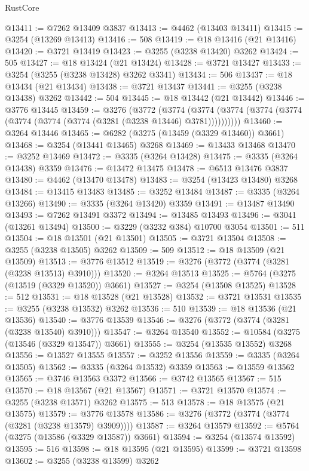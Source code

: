 \begin{lexlean}{RustCore}
\begin{coremodule}
@13411 := @7262 @13409 @3837
@13413 := @4462 (@13403 @13411)
@13415 := @3254 (@13269 @13413)
@13416 := 508
@13419 := @18 @13416 (@21 @13416)
@13420 := @3721 @13419
@13423 := @3255 (@3238 @13420) @3262
@13424 := 505
@13427 := @18 @13424 (@21 @13424)
@13428 := @3721 @13427
@13433 := @3254 (@3255 (@3238 @13428) @3262 @3341)
@13434 := 506
@13437 := @18 @13434 (@21 @13434)
@13438 := @3721 @13437
@13441 := @3255 (@3238 @13438) @3262
@13442 := 504
@13445 := @18 @13442 (@21 @13442)
@13446 := @3776 @13445
@13459 := @3276
    (@3772
      (@3774 (@3774 (@3774 (@3774 (@3774 (@3774 (@3774 (@3774 (@3281 (@3238 @13446) @3781))))))))))
@13460 := @3264 @13446
@13465 := @6282 (@3275 (@13459 (@3329 @13460)) @3661)
@13468 := @3254 (@13441 @13465) @3268
@13469 := @13433 @13468
@13470 := @3252 @13469
@13472 := @3335 (@3264 @13428)
@13475 := @3335 (@3264 @13438) @3359
@13476 := @13472 @13475
@13478 := @6513 @13476 @3837
@13480 := @4462 (@13470 @13478)
@13483 := @3254 (@13423 @13480) @3268
@13484 := @13415 @13483
@13485 := @3252 @13484
@13487 := @3335 (@3264 @13266)
@13490 := @3335 (@3264 @13420) @3359
@13491 := @13487 @13490
@13493 := @7262 @13491 @3372
@13494 := @13485 @13493
@13496 := @3041 (@13261 @13494)
@13500 := @3229 (@3232 @384) @10700 @3054
@13501 := 511
@13504 := @18 @13501 (@21 @13501)
@13505 := @3721 @13504
@13508 := @3255 (@3238 @13505) @3262
@13509 := 509
@13512 := @18 @13509 (@21 @13509)
@13513 := @3776 @13512
@13519 := @3276 (@3772 (@3774 (@3281 (@3238 @13513) @3910)))
@13520 := @3264 @13513
@13525 := @5764 (@3275 (@13519 (@3329 @13520)) @3661)
@13527 := @3254 (@13508 @13525)
@13528 := 512
@13531 := @18 @13528 (@21 @13528)
@13532 := @3721 @13531
@13535 := @3255 (@3238 @13532) @3262
@13536 := 510
@13539 := @18 @13536 (@21 @13536)
@13540 := @3776 @13539
@13546 := @3276 (@3772 (@3774 (@3281 (@3238 @13540) @3910)))
@13547 := @3264 @13540
@13552 := @10584 (@3275 (@13546 (@3329 @13547)) @3661)
@13555 := @3254 (@13535 @13552) @3268
@13556 := @13527 @13555
@13557 := @3252 @13556
@13559 := @3335 (@3264 @13505)
@13562 := @3335 (@3264 @13532) @3359
@13563 := @13559 @13562
@13565 := @3746 @13563 @3372
@13566 := @3742 @13565
@13567 := 515
@13570 := @18 @13567 (@21 @13567)
@13571 := @3721 @13570
@13574 := @3255 (@3238 @13571) @3262
@13575 := 513
@13578 := @18 @13575 (@21 @13575)
@13579 := @3776 @13578
@13586 := @3276 (@3772 (@3774 (@3774 (@3281 (@3238 @13579) @3909))))
@13587 := @3264 @13579
@13592 := @5764 (@3275 (@13586 (@3329 @13587)) @3661)
@13594 := @3254 (@13574 @13592)
@13595 := 516
@13598 := @18 @13595 (@21 @13595)
@13599 := @3721 @13598
@13602 := @3255 (@3238 @13599) @3262

\end{coremodule}
\end{lexlean}
